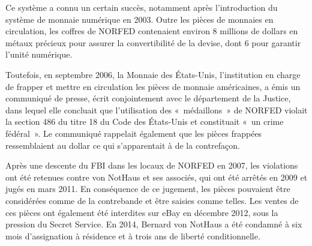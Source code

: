 Ce système a connu un certain succès, notamment après l'introduction du système de monnaie numérique en 2003. Outre les pièces de monnaies en circulation, les coffres de NORFED contenaient environ 8 millions de dollars en métaux précieux pour assurer la convertibilité de la devise, dont 6 pour garantir l'unité numérique.

Toutefois, en septembre 2006, la Monnaie des États-Unis, l'institution en charge de frapper et mettre en circulation les pièces de monnaie américaines, a émis un communiqué de presse, écrit conjointement avec le département de la Justice, dans lequel elle concluait que l'utilisation des «~médaillons~» de NORFED violait la section 486 du titre 18 du Code des États-Unis et constituait «~un crime fédéral~». Le communiqué rappelait également que les pièces frappées ressemblaient au dollar ce qui s'apparentait à de la contrefaçon.

Après une descente du FBI dans les locaux de NORFED en 2007, les violations ont été retenues contre von NotHaus et ses associés, qui ont été arrêtés en 2009 et jugés en mars 2011. En conséquence de ce jugement, les pièces pouvaient être considérées comme de la contrebande et être saisies comme telles. Les ventes de ces pièces ont également été interdites sur eBay en décembre 2012, sous la pression du Secret Service. En 2014, Bernard von NotHaus a été condamné à six mois d'assignation à résidence et à trois ans de liberté conditionnelle.

